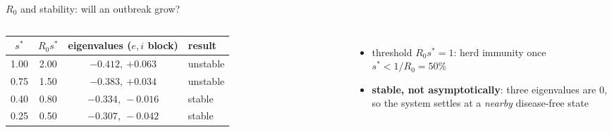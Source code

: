 \begin{frame}{$R_0$ and stability: will an outbreak grow?}
\begin{columns}[T,onlytextwidth]
  \scriptsize\setlength{\tabcolsep}{5pt}
  \centering
  \begin{tabular}{@{}cccl@{}}
    \toprule
    $s^*$ & $R_0 s^*$ & eigenvalues ($e,i$ block) & result \\
    \midrule
    1.00 & 2.00 & $-0.412,\ \mathbf{+0.063}$ & unstable \\
    0.75 & 1.50 & $-0.383,\ \mathbf{+0.034}$ & unstable \\
    0.40 & 0.80 & $-0.334,\ -0.016$ & stable \\
    0.25 & 0.50 & $-0.307,\ -0.042$ & stable \\
    \bottomrule
  \end{tabular}\\[4pt]
  \raggedright\footnotesize
  \begin{itemize}\setlength{\itemsep}{1pt}
    \item threshold $R_0 s^* = 1$: herd immunity once $s^* < 1/R_0 = 50\%$
    \item \textbf{stable, not asymptotically}: three eigenvalues are 0, so the system settles at a \emph{nearby} disease-free state
  \end{itemize}
\end{columns}
\end{frame}

